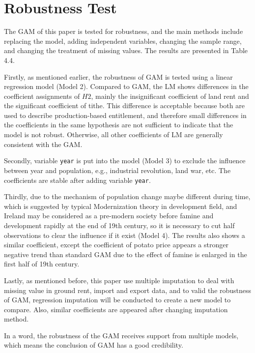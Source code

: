 \newpage

\section{Robustness Test}

The GAM of this paper is tested for robustness, and the main methods include replacing the model, adding independent variables, changing the sample range, and changing the treatment of missing values. The results are presented in Table 4.4.

Firstly, as mentioned earlier, the robustness of GAM is tested using a linear regression model (Model 2). Compared to GAM, the LM shows differences in the coefficient assignments of $H2$, mainly the insignificant coefficient of land rent and the significant coefficient of tithe. This difference is acceptable because both are used to describe production-based entitlement, and therefore small differences in the coefficients in the same hypothesis are not sufficient to indicate that the model is not robust. Otherwise, all other coefficients of LM are generally consistent with the GAM.

Secondly, variable \texttt{year} is put into the model (Model 3) to exclude the influence between year and population, e.g., industrial revolution, land war, etc. The coefficients are stable after adding variable \texttt{year}.

Thirdly, due to the mechanism of population change maybe different during time, which is suggested by typical Modernization theory \citep{tipps1973modernization} in development field, and Ireland may be considered as a pre-modern society before famine and development rapidly at the end of 19th century, so it is necessary to cut half observations to clear the influence if it exist (Model 4). The results also shows a similar coefficient, except the coefficient of potato price appears a stronger negative trend than standard GAM due to the effect of famine is enlarged in the first half of 19th century.

Lastly, as mentioned before, this paper use multiple imputation to deal with missing value in ground rent, import and export data, and to valid the robustness of GAM, regression imputation will be conducted to create a new model to compare. Also, similar coefficients are appeared after changing imputation method. 

In a word, the robustness of the GAM receives support from multiple models, which means the conclusion of GAM has a good credibility.

